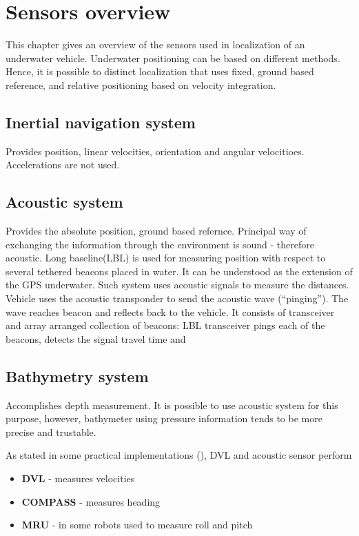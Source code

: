 \chapter{Sensors overview} \label{chap:sensors}

This chapter gives an overview of the sensors used in localization of an underwater vehicle.  Underwater positioning can be based on different methods. Hence, it is possible to distinct localization that uses fixed, ground based reference, and relative positioning based on velocity integration.

\section{Inertial navigation system}
Provides position, linear velocities, orientation and angular velocitioes. Accelerations are not used. 
\section{Acoustic system}
Provides the absolute position, ground based refernce. Principal way of exchanging the information through the environment is sound - therefore acoustic.
Long baseline(LBL) is used for measuring position with respect to several tethered beacons placed in water. It can be understood as the extension of the GPS underwater. Such system uses acoustic signals to measure the distances. Vehicle uses the acoustic transponder to send the acoustic wave (``pinging''). The wave reaches beacon and reflects back to the vehicle. It consists of transceiver and array arranged collection of beacons: LBL transceiver pings each of the beacons, detects the signal travel time and 
\section{Bathymetry system}
Accomplishes depth measurement. It is possible to use acoustic system for this purpose, however, bathymeter using pressure information tends to be more precise and trustable.

As stated in some practical implementations (\cite{blain03}), DVL and acoustic sensor perform 

\begin{itemize}
\item \textbf{DVL} - measures velocities
\item \textbf{COMPASS} - measures heading
\item \textbf{MRU} - in some robots used to measure roll and pitch
\end{itemize}